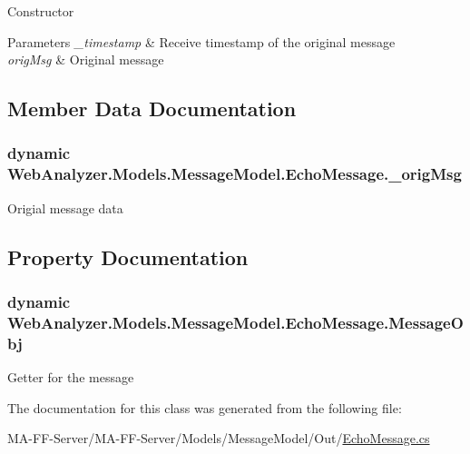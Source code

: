 Constructor 


\begin{DoxyParams}{Parameters}
{\em \+\_\+timestamp} & Receive timestamp of the original message\\
\hline
{\em orig\+Msg} & Original message\\
\hline
\end{DoxyParams}


\subsection{Member Data Documentation}
\hypertarget{class_web_analyzer_1_1_models_1_1_message_model_1_1_echo_message_ab768c1c02458db990e061e552c794f14}{}
\subsubsection[{\+\_\+orig\+Msg}]{\setlength{\rightskip}{0pt plus 5cm}dynamic Web\+Analyzer.\+Models.\+Message\+Model.\+Echo\+Message.\+\_\+orig\+Msg\hspace{0.3cm}{\ttfamily [private]}}\label{class_web_analyzer_1_1_models_1_1_message_model_1_1_echo_message_ab768c1c02458db990e061e552c794f14}


Origial message data 



\subsection{Property Documentation}
\hypertarget{class_web_analyzer_1_1_models_1_1_message_model_1_1_echo_message_a547379308602e0e2a8af2a9790d3e9a4}{}
\subsubsection[{Message\+Obj}]{\setlength{\rightskip}{0pt plus 5cm}dynamic Web\+Analyzer.\+Models.\+Message\+Model.\+Echo\+Message.\+Message\+Obj\hspace{0.3cm}{\ttfamily [get]}}\label{class_web_analyzer_1_1_models_1_1_message_model_1_1_echo_message_a547379308602e0e2a8af2a9790d3e9a4}


Getter for the message 



The documentation for this class was generated from the following file\+:\begin{DoxyCompactItemize}
\item 
M\+A-\/\+F\+F-\/\+Server/\+M\+A-\/\+F\+F-\/\+Server/\+Models/\+Message\+Model/\+Out/\hyperlink{_echo_message_8cs}{Echo\+Message.\+cs}\end{DoxyCompactItemize}
